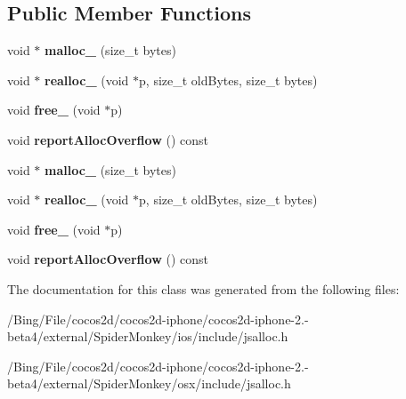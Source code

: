 \subsection*{Public Member Functions}
\begin{DoxyCompactItemize}
\item 
\hypertarget{classjs_1_1_system_alloc_policy_a9c5d34c38e7b73cdc5b5c45699fc14a8}{void $\ast$ {\bfseries malloc\-\_\-} (size\-\_\-t bytes)}\label{classjs_1_1_system_alloc_policy_a9c5d34c38e7b73cdc5b5c45699fc14a8}

\item 
\hypertarget{classjs_1_1_system_alloc_policy_a3a05e9026faaa547357131ac6b373ba3}{void $\ast$ {\bfseries realloc\-\_\-} (void $\ast$p, size\-\_\-t old\-Bytes, size\-\_\-t bytes)}\label{classjs_1_1_system_alloc_policy_a3a05e9026faaa547357131ac6b373ba3}

\item 
\hypertarget{classjs_1_1_system_alloc_policy_a889606224c600ab67d98e608308d0a12}{void {\bfseries free\-\_\-} (void $\ast$p)}\label{classjs_1_1_system_alloc_policy_a889606224c600ab67d98e608308d0a12}

\item 
\hypertarget{classjs_1_1_system_alloc_policy_a323d7163227419126cf9e816c1ee3f64}{void {\bfseries report\-Alloc\-Overflow} () const }\label{classjs_1_1_system_alloc_policy_a323d7163227419126cf9e816c1ee3f64}

\item 
\hypertarget{classjs_1_1_system_alloc_policy_a9c5d34c38e7b73cdc5b5c45699fc14a8}{void $\ast$ {\bfseries malloc\-\_\-} (size\-\_\-t bytes)}\label{classjs_1_1_system_alloc_policy_a9c5d34c38e7b73cdc5b5c45699fc14a8}

\item 
\hypertarget{classjs_1_1_system_alloc_policy_a3a05e9026faaa547357131ac6b373ba3}{void $\ast$ {\bfseries realloc\-\_\-} (void $\ast$p, size\-\_\-t old\-Bytes, size\-\_\-t bytes)}\label{classjs_1_1_system_alloc_policy_a3a05e9026faaa547357131ac6b373ba3}

\item 
\hypertarget{classjs_1_1_system_alloc_policy_a889606224c600ab67d98e608308d0a12}{void {\bfseries free\-\_\-} (void $\ast$p)}\label{classjs_1_1_system_alloc_policy_a889606224c600ab67d98e608308d0a12}

\item 
\hypertarget{classjs_1_1_system_alloc_policy_a323d7163227419126cf9e816c1ee3f64}{void {\bfseries report\-Alloc\-Overflow} () const }\label{classjs_1_1_system_alloc_policy_a323d7163227419126cf9e816c1ee3f64}

\end{DoxyCompactItemize}


The documentation for this class was generated from the following files\-:\begin{DoxyCompactItemize}
\item 
/\-Bing/\-File/cocos2d/cocos2d-\/iphone/cocos2d-\/iphone-\/2.-\/beta4/external/\-Spider\-Monkey/ios/include/jsalloc.\-h\item 
/\-Bing/\-File/cocos2d/cocos2d-\/iphone/cocos2d-\/iphone-\/2.-\/beta4/external/\-Spider\-Monkey/osx/include/jsalloc.\-h\end{DoxyCompactItemize}

